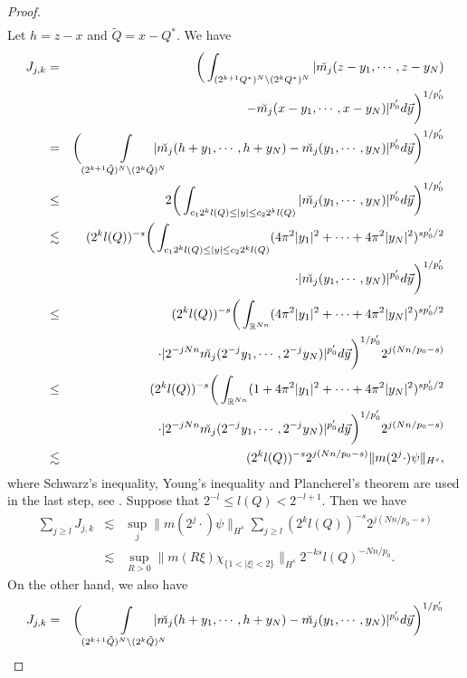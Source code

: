 \documentclass[11pt,oneside,onecolumn]{amsart}
\numberwithin{equation}{section}
\begin{document}
\begin{proof}
\begin{eqnarray*}
\end{eqnarray*}
Let $h=z-x$ and $\tilde{Q}=x-Q^*$. We have
\begin{eqnarray*}
J_{j,k}&=&\bigg(\int_{(2^{k+1}Q^*)^N\setminus (2^kQ^*)^N}|\breve{m_j}(z-y_1, \cdots, z-y_N)\\ &&\quad
-\breve{m_j}(x-y_1, \cdots, x-y_N)|^{p_0'}d\vec{y}\bigg)^{1/{p_0'}}\\
&=&\bigg(\int\limits_{(2^{k+1}\tilde{Q})^N\setminus (2^k\tilde{Q})^N}
  \hskip -14pt |\breve{m_j}(h+y_1, \cdots, h+y_N)
-\breve{m_j}(y_1, \cdots, y_N)|^{p_0'}d\vec{y}\bigg)^{1/{p_0'}}\\
&\le&2\bigg(\int_{c_1 2^kl(Q)\le  |y|\le c_2 2^k l(Q)}|\breve{m_j}(y_1, \cdots, y_N)|^{p_0'}d\vec{y}\bigg)^{1/{p_0'}}\\
&\lesssim&(2^{k} l(Q))^{-s}\bigg(\int_{c_1 2^kl(Q)\le |y|\le  c_2 2^k l(Q)}(4\pi^2|y_1|^2+\cdots+4\pi^2|y_N|^2)^{sp_0'/2}\\
&&\quad\cdot|\breve{m_j}(y_1, \cdots, y_N)|^{p_0'}d\vec{y}\bigg)^{1/{p_0'}}\\
&\le&(2^{k} l(Q))^{-s}\bigg(\int_{{\mathbb{R}}^{Nn}}(4\pi^2|y_1|^2+\cdots+4\pi^2|y_N|^2)^{sp_0'/2}\\
&&\quad\cdot|2^{-jNn}\breve{m_j}(2^{-j}y_1, \cdots, 2^{-j}y_N)|^{p_0'}d\vec{y}\bigg)^{1/{p_0'}}2^{j(Nn/{p_0}-s)}\\
&\le&(2^{k} l(Q))^{-s}\bigg(\int_{{\mathbb{R}}^{Nn}}(1+4\pi^2|y_1|^2+\cdots+4\pi^2|y_N|^2)^{sp_0'/2}\\
&&\quad\cdot|2^{-jNn}\breve{m_j}(2^{-j}y_1, \cdots, 2^{-j}y_N)|^{p_0'}d\vec{y}\bigg)^{1/{p_0'}}2^{j(Nn/{p_0}-s)}\\
&\lesssim&(2^k l(Q))^{-s}2^{j(Nn/{p_0}-s)}\|m(2^j\cdot)\psi\|_{H^s},
\end{eqnarray*}
where Schwarz's inequality, Young's inequality and Plancherel's theorem are used in the last step, see \cite[Lemma 3.3]{T}.
Suppose that $2^{-l}\le l(Q)<2^{-l+1}$. Then we have
\begin{eqnarray}
\sum_{j\ge l}J_{j,k}&\lesssim&\sup_{j}\|m(2^j\cdot)\psi\|_{H^s}\sum_{j\ge l}(2^k l(Q))^{-s}2^{j(Nn/{p_0}-s)}\label{eq:e9}\\
&\lesssim&\sup_{R>0}\|m(R\xi)\chi^{}_{\{1<|\xi|<2\}}\|_{H^s}2^{-ks}l(Q)^{-Nn/{p_0}}.\nonumber
\end{eqnarray}
On the other hand, we also have
\begin{eqnarray*}
J_{j,k}
&=&\bigg(\int\limits_{(2^{k+1}\tilde{Q})^N\setminus (2^k\tilde{Q})^N}
  \hskip -14pt |\breve{m_j}(h+y_1, \cdots, h+y_N)
-\breve{m_j}(y_1, \cdots, y_N)|^{p_0'}d\vec{y}\bigg)^{1/{p_0'}}\\

\end{eqnarray*}
\end{proof}
\end{document}
